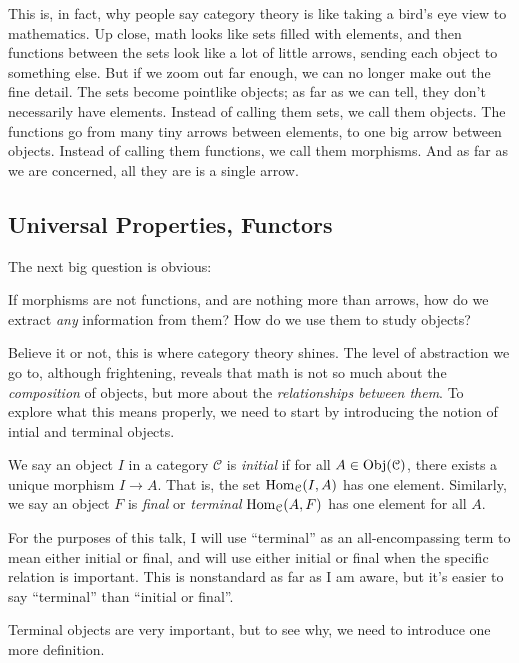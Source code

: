 \documentclass[11pt, letterpaper]{article}
\begin{document}
This is, in fact, why people say category theory is like taking a bird's eye view to mathematics. Up close, math looks like sets filled with elements, and then functions between the sets look like a lot of little arrows, sending each object to something else. But if we zoom out far enough, we can no longer make out the fine detail. The sets become pointlike objects; as far as we can tell, they don't necessarily have elements. Instead of calling them sets, we call them objects. The functions go from many tiny arrows between elements, to one big arrow between objects. Instead of calling them functions, we call them morphisms. And as far as we are concerned, all they are is a single arrow.

\subsection{Universal Properties, Functors}

The next big question is obvious:
\begin{displayquote}
	If morphisms are not functions, and are nothing more than arrows, how do we extract \emph{any} information from them? How do we use them to study objects?
\end{displayquote}
Believe it or not, this is where category theory shines. The level of abstraction we go to, although frightening, reveals that math is not so much about the \emph{composition} of objects, but more about the \emph{relationships between them}. To explore what this means properly, we need to start by introducing the notion of intial and terminal objects.
\begin{definition}\label{dfn:3}
	We say an object $I$ in a category $\mathcal{C} $ is \emph{initial} if for all $A\in \operatorname{Obj}(\mathcal{C} ) $, there exists a unique morphism $I\to A$. That is, the set $\operatorname{Hom}_{\mathcal{C} }(I, A) $ has one element. Similarly, we say an object $F$ is \emph{final} or \emph{terminal} $\operatorname{Hom}_{\mathcal{C} }(A, F) $ has one element for all $A$.
\end{definition}

For the purposes of this talk, I will use ``terminal'' as an all-encompassing term to mean either initial or final, and will use either initial or final when the specific relation is important. This is nonstandard as far as I am aware, but it's easier to say ``terminal'' than ``initial or final''.

Terminal objects are very important, but to see why, we need to introduce one more definition.
\end{document}
